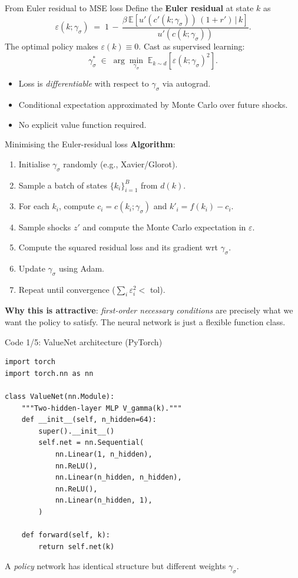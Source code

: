 \begin{frame}{From Euler residual to MSE loss}
Define the \textbf{Euler residual} at state $k$ as
\[
\varepsilon(k;\gamma_\sigma) \;=\; 1 \,-\, \frac{\beta\,\mathbb{E}\!\left[u'(c'(k;\gamma_\sigma))\,(1+r')\,\big|\,k\right]}{u'(c(k;\gamma_\sigma))}.
\]
\medskip
The optimal policy makes $\varepsilon(k)\equiv 0$. Cast as supervised learning:
\[
\gamma_\sigma^{*} \;\in\; \arg\min_{\gamma_\sigma}\; \mathbb{E}_{k\sim d}\!\left[\varepsilon(k;\gamma_\sigma)^2\right].
\]
\medskip
\begin{itemize}
\item Loss is \emph{differentiable} with respect to $\gamma_\sigma$ via autograd.
\item Conditional expectation approximated by Monte Carlo over future shocks.
\item No explicit value function required.
\end{itemize}
\end{frame}

\begin{frame}{Minimising the Euler-residual loss}
\textbf{Algorithm}:
\begin{enumerate}
\item Initialise $\gamma_\sigma$ randomly (e.g., Xavier/Glorot).
\item Sample a batch of states $\{k_i\}_{i=1}^B$ from $d(k)$.
\item For each $k_i$, compute $c_i = c(k_i;\gamma_\sigma)$ and $k'_i = f(k_i) - c_i$.
\item Sample shocks $z'$ and compute the Monte Carlo expectation in $\varepsilon$.
\item Compute the squared residual loss and its gradient wrt $\gamma_\sigma$.
\item Update $\gamma_\sigma$ using Adam.
\item Repeat until convergence ($\sum_i \varepsilon_i^2 < $ tol).
\end{enumerate}
\medskip
\textbf{Why this is attractive}: \emph{first-order necessary conditions} are precisely what we want the policy to satisfy. The neural network is just a flexible function class.
\end{frame}

\begin{frame}[fragile]{Code 1/5: ValueNet architecture (PyTorch)}
\begin{lstlisting}
import torch
import torch.nn as nn

class ValueNet(nn.Module):
    """Two-hidden-layer MLP V_gamma(k)."""
    def __init__(self, n_hidden=64):
        super().__init__()
        self.net = nn.Sequential(
            nn.Linear(1, n_hidden),
            nn.ReLU(),
            nn.Linear(n_hidden, n_hidden),
            nn.ReLU(),
            nn.Linear(n_hidden, 1),
        )

    def forward(self, k):
        return self.net(k)
\end{lstlisting}
\medskip
A \emph{policy} network has identical structure but different weights $\gamma_\sigma$.
\end{frame}

